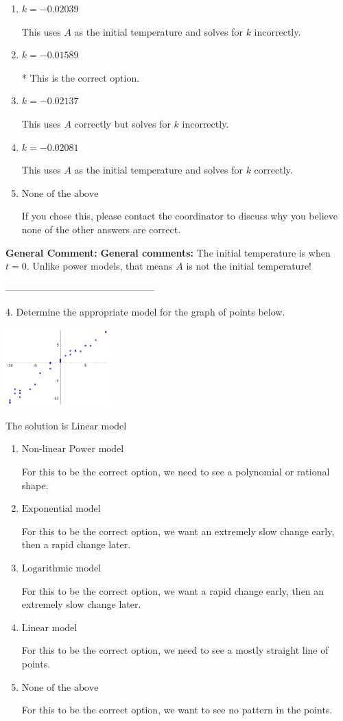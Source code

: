 \documentclass{extbook}[14pt]
\begin{document}
\begin{enumerate}[label=\Alph*.] 
\item $ k = -0.02039 $ 

 This uses $A$ as the initial temperature and solves for $k$ incorrectly. 
\item $ k = -0.01589 $ 

 * This is the correct option. 
\item $ k = -0.02137 $ 

 This uses $A$ correctly but solves for $k$ incorrectly. 
\item $ k = -0.02081 $ 

 This uses $A$ as the initial temperature and solves for $k$ correctly. 
\item $ \text{None of the above} $ 

 If you chose this, please contact the coordinator to discuss why you believe none of the other answers are correct. 
\end{enumerate} 
 
\textbf{General Comment:} \textbf{General comments:} The initial temperature is when $t = 0$. Unlike power models, that means $A$ is not the initial temperature! 

-----------------------------------------------

4. Determine the appropriate model for the graph of points below.
\begin{center} \includegraphics[width=0.3\textwidth]{../Figures/identifyModelGraph11B.png} \end{center} 

The solution is $ \text{Linear model} $ 

\begin{enumerate}[label=\Alph*.] 
\item $ \text{Non-linear Power model} $ 

 For this to be the correct option, we need to see a polynomial or rational shape. 
\item $ \text{Exponential model} $ 

 For this to be the correct option, we want an extremely slow change early, then a rapid change later. 
\item $ \text{Logarithmic model} $ 

 For this to be the correct option, we want a rapid change early, then an extremely slow change later. 
\item $ \text{Linear model} $ 

 For this to be the correct option, we need to see a mostly straight line of points. 
\item $ \text{None of the above} $ 

 For this to be the correct option, we want to see no pattern in the points. 
\end{enumerate} 
 
\end{document}
